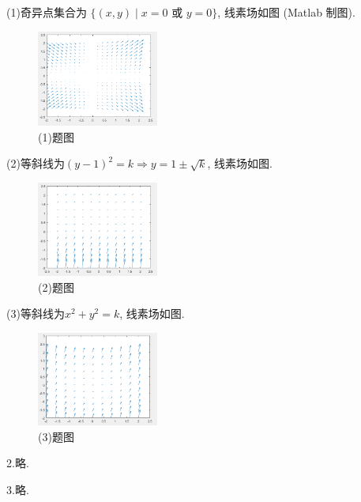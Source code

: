 \begin{solve}
  (1)奇异点集合为 $\{(x,y)\mid x=0\text{\ 或\ }y=0\}$, 线素场如图 (Matlab 制图).
  \begin{figure}[htb]
  \centering
  \includegraphics[width=4cm]{figure/ODE1_2_1.png}
  \caption{(1)题图}
  \end{figure}

  (2)等斜线为$(y-1)^2=k\Rightarrow y=1\pm\sqrt{k}$, 线素场如图.
  \begin{figure}[htb]
  \centering
  \includegraphics[width=4cm]{figure/ODE1_2_2.png}
  \caption{(2)题图}
  \end{figure}

  (3)等斜线为$x^2+y^2=k$, 线素场如图.
  \begin{figure}[htb]
  \centering
  \includegraphics[width=4cm]{figure/ODE1_2_3.png}
  \caption{(3)题图}
  \end{figure}
\end{solve}

2.略.

3.略.